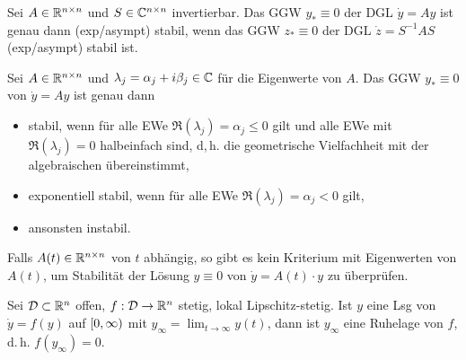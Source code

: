 \documentclass{cheat-sheet}
\newcommand{\D}{\mathcal{D}}
\begin{document}

\begin{satz}
  Sei $A \in \mathbb{R}^{n \times n}$ und $S \in \mathbb{C}^{n \times n}$ invertierbar. Das GGW $y_* \equiv 0$ der DGL $\dot{y} = Ay$ ist genau dann (exp/asympt) stabil, wenn das GGW $z_* \equiv 0$ der DGL $\dot{z} = S^{-1} A S$ (exp/asympt) stabil ist.
\end{satz}

\begin{satz}
  Sei $A \in \mathbb{R}^{n \times n}$ und $\lambda_j = \alpha_j + i \beta_j \in \mathbb{C}$ für die Eigenwerte von $A$. Das GGW $y_* \equiv 0$ von $\dot{y} = Ay$ ist genau dann
  \begin{itemize}
    \item stabil, wenn für alle EWe $\Re(\lambda_j) = \alpha_j \leq 0$ gilt und alle EWe mit $\Re(\lambda_j) = 0$ halbeinfach sind, d,\,h. die geometrische Vielfachheit mit der algebraischen übereinstimmt,
    \item exponentiell stabil, wenn für alle EWe $\Re(\lambda_j) = \alpha_j < 0$ gilt,
    \item ansonsten instabil.
  \end{itemize}
\end{satz}


\begin{bem}
  Falls $A(t) \in \mathbb{R}^{n \times n}$ von $t$ abhängig, so gibt es kein Kriterium mit Eigenwerten von $A(t)$, um Stabilität der Lösung $y \equiv 0$ von $\dot{y} = A(t) \cdot y$ zu überprüfen.
\end{bem}


\begin{lem}
  Sei $\D \subset \R^n$ offen, $f : \D \to \R^n$ stetig, lokal Lipschitz-stetig. Ist $y$ eine Lsg von $\dot{y} = f(y)$ auf $\left[ 0, \infty \right)$ mit $y_{\infty} = \lim_{t \to \infty} y(t)$, dann ist $y_{\infty}$ eine Ruhelage von $f$, d.\,h. $f(y_{\infty}) = 0$.
\end{lem}
\end{document}
